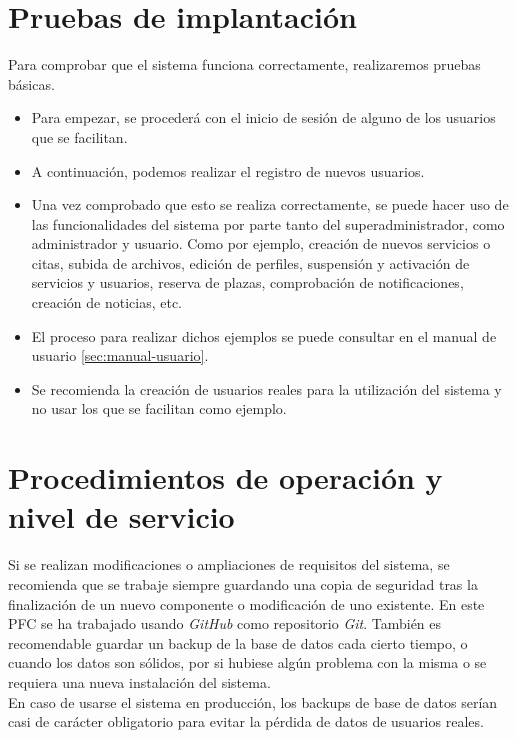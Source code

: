 \section{Pruebas de implantación}

Para comprobar que el sistema funciona correctamente, realizaremos pruebas básicas. 

\begin{itemize}
\item Para empezar, se procederá con el inicio de sesión de alguno de los usuarios que se facilitan.
\item A continuación, podemos realizar el registro de nuevos usuarios.
\item Una vez comprobado que esto se realiza correctamente, se puede hacer uso de las funcionalidades del sistema por parte tanto del superadministrador, como administrador y usuario. Como por ejemplo, creación de nuevos servicios o citas, subida de archivos, edición de perfiles, suspensión y activación de servicios y usuarios, reserva de plazas, comprobación de notificaciones, creación de noticias, etc. 
\item El proceso para realizar dichos ejemplos se puede consultar en el manual de usuario \ref{sec:manual-usuario}.
\item Se recomienda la creación de usuarios reales para la utilización del sistema y no usar los que se facilitan como ejemplo. 
\end{itemize}


\section{Procedimientos de operación y nivel de servicio}

Si se realizan modificaciones o ampliaciones de requisitos del sistema, se recomienda que se trabaje siempre guardando una copia de seguridad tras la finalización de un nuevo componente o modificación de uno existente. En este PFC se ha trabajado usando \textit{GitHub} como repositorio \textit{Git}. También es recomendable guardar un backup de la base de datos cada cierto tiempo, o cuando los datos son sólidos, por si hubiese algún problema con la misma o se requiera una nueva instalación del sistema. \\

En caso de usarse el sistema en producción, los backups de base de datos serían casi de carácter obligatorio para evitar la pérdida de datos de usuarios reales. 

